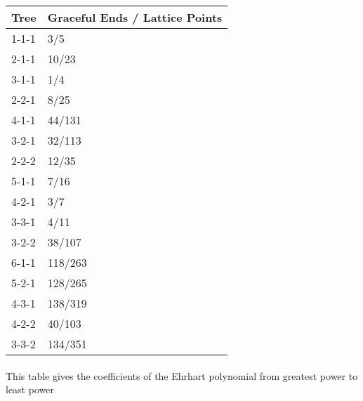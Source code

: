 \documentclass{article}
\begin{document}
\begin{center}
              \begin{tabular}{| l | l |}
              \hline
              Tree & Graceful Ends / Lattice Points \\ 
              \hline
1-1-1 & 3/5                 \\ 
\hline
2-1-1 & 10/23                 \\ 
\hline
3-1-1 & 1/4                 \\ 
\hline
2-2-1 & 8/25                 \\ 
\hline
4-1-1 & 44/131                 \\ 
\hline
3-2-1 & 32/113                 \\ 
\hline
2-2-2 & 12/35                 \\ 
\hline
5-1-1 & 7/16                 \\ 
\hline
4-2-1 & 3/7                 \\ 
\hline
3-3-1 & 4/11                 \\ 
\hline
3-2-2 & 38/107                 \\ 
\hline
6-1-1 & 118/263                 \\ 
\hline
5-2-1 & 128/265                 \\ 
\hline
4-3-1 & 138/319                 \\ 
\hline
4-2-2 & 40/103                 \\ 
\hline
3-3-2 & 134/351                 \\ 
\hline
\hline
              \end{tabular}
              \end{center}\paragraph{} This table gives the coefficients of the Ehrhart     polynomial from greatest power to least power
\end{document}
